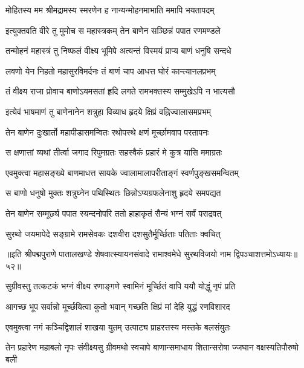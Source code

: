 \twolineshloka
{मोहितस्य मम श्रीमद्रामस्य स्मरणेन ह}
{नान्यन्मोहनमाभाति ममापि भयतापदम्}%

\twolineshloka
{इत्युक्तवति वीरे तु मुमोच स महास्त्रकम्}
{तेन बाणेन सञ्छिन्नं पपात रणमण्डले}%

\twolineshloka
{तन्मोहनं महास्त्रं तु निष्फलं वीक्ष्य भूमिपे}
{अत्यन्तं विस्मयं प्राप्य बाणं धनुषि सन्दधे}%

\twolineshloka
{लवणो येन निहतो महासुरविमर्दनः}
{तं बाणं चाप आधत्त घोरं कान्त्यानलप्रभम्}%

\twolineshloka
{तं वीक्ष्य राजा प्रोवाच बाणोऽयमसतां हृदि}
{लगते रामभक्तस्य सम्मुखेऽपि न भात्यसौ}%

\twolineshloka
{इत्येवं भाषमाणं तु बाणेनानेन शत्रुहा}
{विव्याध हृदये क्षिप्रं वह्निज्वालासमप्रभम्}%

\twolineshloka
{तेन बाणेन दुःखार्तो महापीडासमन्वितः}
{रथोपस्थे क्षणं मूर्च्छामवाप परतापनः}%

\twolineshloka
{स क्षणात्तां व्यथां तीर्त्वा जगाद रिपुमग्रतः}
{सहस्वैकं प्रहारं मे कुत्र यासि ममाग्रतः}%

\twolineshloka
{एवमुक्त्वा महासङ्ख्ये बाणमाधत्त सायके}
{ज्वालामालापरीताङ्गं स्वर्णपुङ्खसमन्वितम्}%

\twolineshloka
{स बाणो धनुषो मुक्तः शत्रुघ्नेन पथिस्थितः}
{छिन्नोऽप्यग्रफलेनाशु हृदये समपद्यत}%

\twolineshloka
{तेन बाणेन सम्मूर्छ्य पपात स्यन्दनोपरि}
{ततो हाहाकृतं सैन्यं भग्नं सर्वं पराद्रवत्}%

\twolineshloka
{सुरथो जयमापेदे सङ्ग्रामे रामसेवकः}
{दशवीरा दशसुतैर्मूर्च्छिताः पतिताः क्वचित्}%

॥इति श्रीपद्मपुराणे पातालखण्डे शेषवात्स्यायनसंवादे रामाश्वमेधे सुरथविजयो नाम द्विपञ्चाशत्तमोऽध्यायः॥५२॥



\twolineshloka
{सुग्रीवस्तु तत्कटकं भग्नं वीक्ष्य रणाङ्गणे}
{स्वामिनं मूर्च्छितं वापि ययौ योद्धुं नृपं प्रति}%

\twolineshloka
{आगच्छ भूप सर्वान्नो मूर्च्छयित्वा कुतो भवान्}
{गच्छति क्षिप्रं मां देहि युद्धं रणविशारद}%

\twolineshloka
{एवमुक्त्वा नगं कञ्चिद्विशालं शाखया युतम्}
{उत्पाट्य प्राहरत्तस्य मस्तके बलसंयुतः}%

\fourlineindentedshloka
{तेन प्रहारेण महाबलो नृपः}
{संवीक्ष्यसु ग्रीवमथो स्वचापे}
{बाणान्समाधाय शितान्सरोषा}
{ज्जघान वक्षस्यतिपौरुषो बली}%

